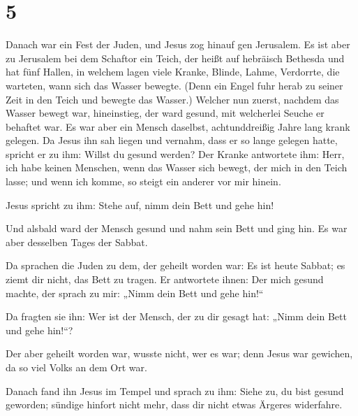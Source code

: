 \hypertarget{section-4}{%
\section{5}\label{section-4}}

 Danach war ein Fest der Juden, und Jesus zog hinauf gen
Jerusalem.  Es ist aber zu Jerusalem bei dem Schaftor ein
Teich, der heißt auf hebräisch Bethesda und hat fünf Hallen,
 in welchem lagen viele Kranke, Blinde, Lahme, Verdorrte,
die warteten, wann sich das Wasser bewegte.  (Denn ein
Engel fuhr herab zu seiner Zeit in den Teich und bewegte das Wasser.)
Welcher nun zuerst, nachdem das Wasser bewegt war, hineinstieg, der ward
gesund, mit welcherlei Seuche er behaftet war.  Es war
aber ein Mensch daselbst, achtunddreißig Jahre lang krank gelegen.
 Da Jesus ihn sah liegen und vernahm, dass er so lange
gelegen hatte, spricht er zu ihm: Willst du gesund werden?
 Der Kranke antwortete ihm: Herr, ich habe keinen
Menschen, wenn das Wasser sich bewegt, der mich in den Teich lasse; und
wenn ich komme, so steigt ein anderer vor mir hinein.

 Jesus spricht zu ihm: Stehe auf, nimm dein Bett und gehe
hin!

 Und alsbald ward der Mensch gesund und nahm sein Bett und
ging hin. Es war aber desselben Tages der Sabbat.

 Da sprachen die Juden zu dem, der geheilt worden war: Es
ist heute Sabbat; es ziemt dir nicht, das Bett zu tragen.
 Er antwortete ihnen: Der mich gesund machte, der sprach
zu mir: „Nimm dein Bett und gehe hin!{}``

 Da fragten sie ihn: Wer ist der Mensch, der zu dir
gesagt hat: „Nimm dein Bett und gehe hin!{}``?

 Der aber geheilt worden war, wusste nicht, wer es war;
denn Jesus war gewichen, da so viel Volks an dem Ort war.

 Danach fand ihn Jesus im Tempel und sprach zu ihm: Siehe
zu, du bist gesund geworden; sündige hinfort nicht mehr, dass dir nicht
etwas Ärgeres widerfahre.

